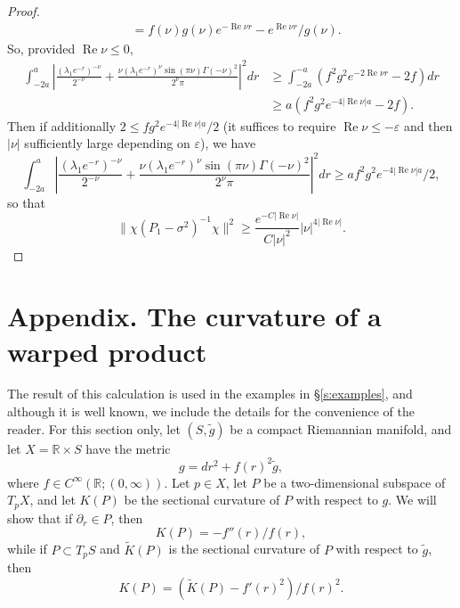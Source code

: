 \documentclass[reqno, 12pt]{amsart}
\newcommand \R {\mathbb{R}}
\newcommand \D {\partial}
\newcommand \eps {\varepsilon}
\DeclareMathOperator \re {Re}
\DeclareMathOperator \im {Im}
\theoremstyle{definition}
\numberwithin{equation}{section}
\numberwithin{prop}{section}
\numberwithin{figure}{section}
\begin{document}
\begin{proof}
\[\begin{split}
&= f(\nu) g(\nu) e^{-\re \nu r} - e^{\re \nu r}/g(\nu).
\end{split}\]
So, provided $\re \nu \le0$,
\[\begin{split}
\int_{-2a}^a \left |\frac{(\lambda_1e^{-r})^{-\nu}}{2^{-\nu}} +  \frac{\nu (\lambda_1e^{-r})^\nu\sin(\pi\nu)\Gamma(-\nu)^2}{2^\nu \pi}\right|^2dr &\ge \int_{-2a}^{-a} \left(f^2g^2 e^{-2\re \nu r} - 2f\right) dr \\
&\ge a(f^2g^2e^{-4|\re \nu| a} -2f).
\end{split}\]
Then if additionally $2 \le fg^2e^{-4|\re \nu| a}/2$ (it suffices to require $\re \nu \le - \eps$ and then $|\nu|$ sufficiently large depending on $\eps$), we have
\[
\int_{-2a}^a \left |\frac{(\lambda_1e^{-r})^{-\nu}}{2^{-\nu}} +  \frac{\nu (\lambda_1e^{-r})^\nu\sin(\pi\nu)\Gamma(-\nu)^2}{2^\nu \pi}\right|^2dr \ge a  f^2g^2e^{-4|\re \nu| a}/2,
\]
so that
\[
\|\chi (P_1- \sigma^2)^{-1} \chi\|^2 \ge \frac {e^{-C|\re \nu|}}{C|\nu|^2}|\nu|^{4|\re \nu|}. %
\]
\end{proof}


\section*{Appendix. The curvature of a warped product}

The result of this calculation is used in the examples in \S\ref{s:examples}, and  although it is well known, we include the details for the convenience of the reader. 
For this section only, let $(S,\tilde g)$ be a compact Riemannian manifold, and let $X = \R \times S$ have the metric
\[g = dr^2 + f(r)^2 \tilde g,\]
where $f \in C^\infty(\R;(0,\infty))$. Let $p \in X$, let $P$ be a two-dimensional subspace of $T_pX$, and let $K(P)$ be the sectional curvature of $P$ with respect to $g$. We will show that if $\D_r \in P$, then
\[K(P) = - f''(r)/f(r),\]
while if $P \subset T_pS$ and $\widetilde K(P)$ is the sectional curvature of $P$ with respect to $\tilde g$, then
\[K(P) = (\widetilde K(P) - f'(r)^2)/f(r)^2.\]
\end{document}
